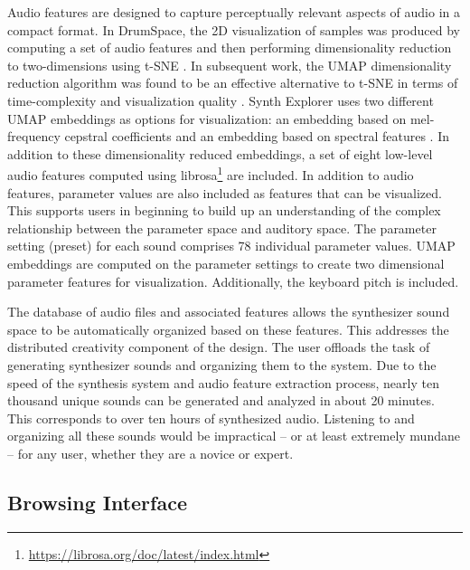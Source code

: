 Audio features are designed to capture perceptually relevant aspects of audio in a compact format. In DrumSpace, the 2D visualization of samples was produced by computing a set of audio features and then performing dimensionality reduction to two-dimensions using t-SNE \cite{turquois2016exploring, van2008visualizing}. In subsequent work, the UMAP dimensionality reduction algorithm \cite{mcinnes2020umap} was found to be an effective alternative to t-SNE in terms of time-complexity and visualization quality \cite{jiale2020visualization}. Synth Explorer uses two different UMAP embeddings as options for visualization: an embedding based on mel-frequency cepstral coefficients and an embedding based on spectral features \cite{peeters2004large}. In addition to these dimensionality reduced embeddings, a set of eight low-level audio features computed using librosa\footnote{\url{https://librosa.org/doc/latest/index.html}} are included. In addition to audio features, parameter values are also included as features that can be visualized. This supports users in beginning to build up an understanding of the complex relationship between the parameter space and auditory space. The parameter setting (preset) for each sound comprises 78 individual parameter values. UMAP embeddings are computed on the parameter settings to create two dimensional parameter features for visualization. Additionally, the keyboard pitch is included.

The database of audio files and associated features allows the synthesizer sound space to be automatically organized based on these features. This addresses the distributed creativity component of the design. The user offloads the task of generating synthesizer sounds and organizing them to the system. Due to the speed of the synthesis system and audio feature extraction process, nearly ten thousand unique sounds can be generated and analyzed in about 20 minutes. This corresponds to over ten hours of synthesized audio. Listening to and organizing all these sounds would be impractical -- or at least extremely mundane -- for any user, whether they are a novice or expert. 

\subsection{Browsing Interface}

